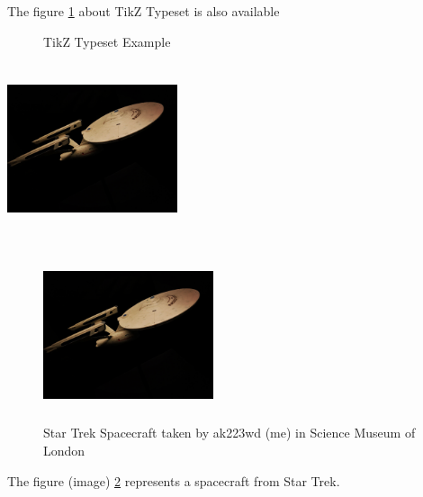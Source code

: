\documentclass{article}
\begin{document}
The figure \ref{tikzT} about TikZ Typeset is also available
\begin{figure}
\begin{center}
\end{center}
\caption{TikZ Typeset Example}
\label{tikzT}
\end{figure}


\break
\begin{center}
\includegraphics[width = 5cm, height=5cm]{IMG_7052.JPG}
\end{center}
\begin{figure}
\begin{center}
\includegraphics[width = 5cm, height=5cm]{IMG_7052.JPG}
\end{center}
\caption{Star Trek Spacecraft taken by ak223wd (me) in Science Museum of London}
\label{Star Trek Spacecraft}
\end{figure}
The  figure (image) \ref{Star Trek Spacecraft} represents a spacecraft from Star Trek.
\end{document}

